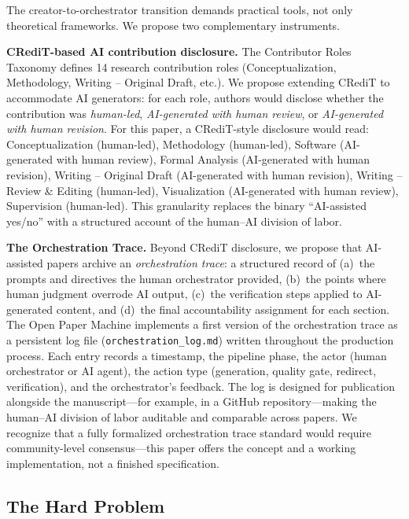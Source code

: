 \documentclass{article}
\begin{document}
The creator-to-orchestrator transition demands practical tools, not only theoretical frameworks. We propose two complementary instruments.

\textbf{CRediT-based AI contribution disclosure.} The Contributor Roles Taxonomy \citep{brand2015credit} defines 14 research contribution roles (Conceptualization, Methodology, Writing -- Original Draft, etc.). We propose extending CRediT to accommodate AI generators: for each role, authors would disclose whether the contribution was \textit{human-led}, \textit{AI-generated with human review}, or \textit{AI-generated with human revision}. For this paper, a CRediT-style disclosure would read: Conceptualization (human-led), Methodology (human-led), Software (AI-generated with human review), Formal Analysis (AI-generated with human revision), Writing -- Original Draft (AI-generated with human revision), Writing -- Review \& Editing (human-led), Visualization (AI-generated with human review), Supervision (human-led). This granularity replaces the binary ``AI-assisted yes/no'' with a structured account of the human--AI division of labor.

\textbf{The Orchestration Trace.} Beyond CRediT disclosure, we propose that AI-assisted papers archive an \textit{orchestration trace}: a structured record of (a)~the prompts and directives the human orchestrator provided, (b)~the points where human judgment overrode AI output, (c)~the verification steps applied to AI-generated content, and (d)~the final accountability assignment for each section. The Open Paper Machine implements a first version of the orchestration trace as a persistent log file (\texttt{orchestration\_log.md}) written throughout the production process. Each entry records a timestamp, the pipeline phase, the actor (human orchestrator or AI agent), the action type (generation, quality gate, redirect, verification), and the orchestrator's feedback. The log is designed for publication alongside the manuscript---for example, in a GitHub repository---making the human--AI division of labor auditable and comparable across papers. We recognize that a fully formalized orchestration trace standard would require community-level consensus---this paper offers the concept and a working implementation, not a finished specification.


\subsection{The Hard Problem}
\end{document}
